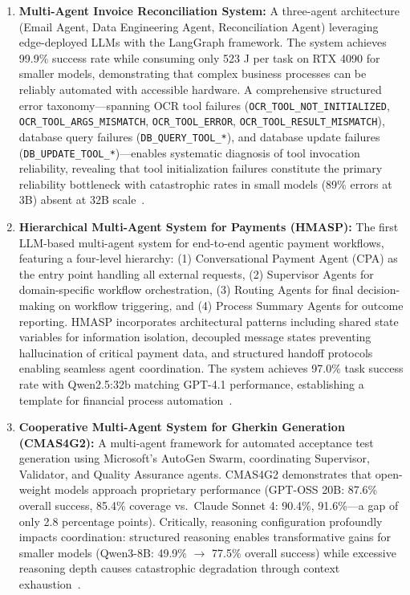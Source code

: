 \begin{enumerate}[leftmargin=*]
    \item \textbf{Multi-Agent Invoice Reconciliation System:} A three-agent architecture (Email Agent, Data Engineering Agent, Reconciliation Agent) leveraging edge-deployed LLMs with the LangGraph framework. The system achieves 99.9\% success rate while consuming only 523 J per task on RTX 4090 for smaller models, demonstrating that complex business processes can be reliably automated with accessible hardware. A comprehensive structured error taxonomy---spanning OCR tool failures (\texttt{OCR\_TOOL\_NOT\_INITIALIZED}, \texttt{OCR\_TOOL\_ARGS\_MISMATCH}, \texttt{OCR\_TOOL\_ERROR}, \texttt{OCR\_TOOL\_RESULT\_MISMATCH}), database query failures (\texttt{DB\_QUERY\_TOOL\_*}), and database update failures (\texttt{DB\_UPDATE\_TOOL\_*})---enables systematic diagnosis of tool invocation reliability, revealing that tool initialization failures constitute the primary reliability bottleneck with catastrophic rates in small models (89\% errors at 3B) absent at 32B scale~\cite{huang2025invoice,huang2026when}.
    
    \item \textbf{Hierarchical Multi-Agent System for Payments (HMASP):} The first LLM-based multi-agent system for end-to-end agentic payment workflows, featuring a four-level hierarchy: (1) Conversational Payment Agent (CPA) as the entry point handling all external requests, (2) Supervisor Agents for domain-specific workflow orchestration, (3) Routing Agents for final decision-making on workflow triggering, and (4) Process Summary Agents for outcome reporting. HMASP incorporates architectural patterns including shared state variables for information isolation, decoupled message states preventing hallucination of critical payment data, and structured handoff protocols enabling seamless agent coordination. The system achieves 97.0\% task success rate with Qwen2.5:32b matching GPT-4.1 performance, establishing a template for financial process automation~\cite{huang2026hmasp}.
    
    \item \textbf{Cooperative Multi-Agent System for Gherkin Generation (CMAS4G2):} A multi-agent framework for automated acceptance test generation using Microsoft's AutoGen Swarm, coordinating Supervisor, Validator, and Quality Assurance agents. CMAS4G2 demonstrates that open-weight models approach proprietary performance (GPT-OSS 20B: 87.6\% overall success, 85.4\% coverage vs.\ Claude Sonnet 4: 90.4\%, 91.6\%---a gap of only 2.8 percentage points). Critically, reasoning configuration profoundly impacts coordination: structured reasoning enables transformative gains for smaller models (Qwen3-8B: 49.9\% $\rightarrow$ 77.5\% overall success) while excessive reasoning depth causes catastrophic degradation through context exhaustion~\cite{huang2026open}.
    

\end{enumerate}
